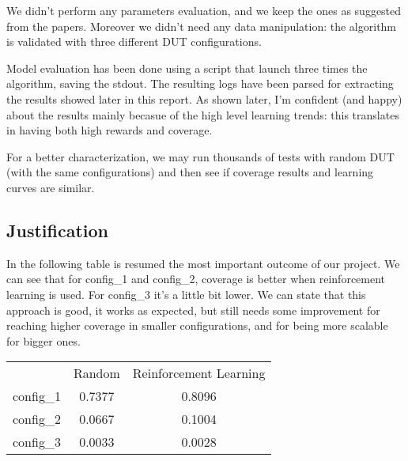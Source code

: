\documentclass{article}
\begin{document}
We didn't perform any parameters evaluation, and we keep the ones as suggested from the papers. Moreover we didn't need any data manipulation: the algorithm is validated with three different DUT configurations.

Model evaluation has been done using a script that launch three times the algorithm, saving the stdout. The resulting logs have been parsed for extracting the results showed later in this report. As shown later, I'm confident (and happy) about the results mainly becasue of the high level learning trends: this translates in having both high rewards and coverage.

For a better characterization, we may run thousands of tests with random DUT (with the same configurations) and then see if coverage results and learning curves are similar.

\subsection{Justification}
% 
% 
% 

In the following table is resumed the most important outcome of our project. We can see that for config\_1 and config\_2, coverage is better when reinforcement learning is used. For config\_3 it's a little bit lower. We can state that this approach is good, it works as expected, but still needs some improvement for reaching higher coverage in smaller configurations, and for being more scalable for bigger ones.

\begin{center}
  \begin{tabular}{ | c | c | c | }
    \hline
      & Random & Reinforcement Learning \\
    config\_1 & 0.7377  & 0.8096 \\
    config\_2 & 0.0667  & 0.1004 \\
    config\_3 & 0.0033  & 0.0028 \\
    \hline
  \end{tabular}
\end{center}
\end{document}
